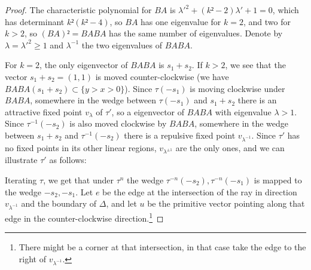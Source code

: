 \documentclass[12pt,a4paper,draft]{scrartcl}
\begin{document}
\begin{proof}
The characteristic polynomial for $BA$ is $λ'^2+(k²-2)λ'+1 = 0$, which has determinant $k²(k²-4)$, so $BA$ has one eigenvalue for $k=2$, and two for $k>2$, so $(BA)²=BABA$ has the same number of eigenvalues.
Denote by $λ=λ'^2≥1$ and $λ^{-1}$ the two eigenvalues of $BABA$.

For $k=2$, the only eigenvector of $BABA$ is $s_1+s_2$. If $k>2$, we see that the vector $s_1+s_2 = (1,1)$ is moved counter-clockwise (we have $BABA(s_1+s_2) ⊂ \{y>x>0\}$).
Since $τ(-s_1)$ is moving clockwise under $BABA$, somewhere in the wedge between $τ(-s_1)$ and $s_1+s_2$ there is an attractive fixed point $v_λ$ of $τ'$, so a eigenvector of $BABA$ with eigenvalue $λ>1$.
Since $τ^{-1}(-s_2)$ is also moved clockwise by $BABA$, somewhere in the wedge between $s_1+s_2$ and $τ^{-1}(-s_2)$ there is a repulsive fixed point $v_{λ^{-1}}$.
Since $τ'$ has no fixed points in its other linear regions, $v_{λ^{±1}}$ are the only ones, and we can illustrate $τ'$ as follows:

\begin{center}
\end{center}

Iterating $τ$, we get that under $τ^n$ the wedge $τ^{-n}(-s_2),τ^{-n}(-s_1)$ is mapped to the wedge $-s_2,-s_1$.
Let $e$ be the edge at the intersection of the ray in direction $v_{λ^{-1}}$ and the boundary of $Δ$, and let $u$ be the primitive vector pointing along that edge in the counter-clockwise direction.\footnote{There might be a corner at that intersection, in that case take the edge to the right of $v_{λ^{-1}}$.}


\end{proof}
\end{document}

